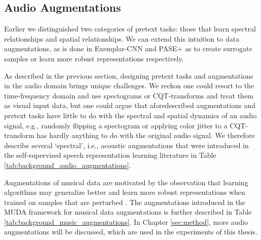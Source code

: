 \subsection{Audio Augmentations}\label{sec:audio_transformations}
Earlier we distinguished two categories of pretext tasks: those that learn spectral relationships and spatial relationships.
We can extend this intuition to data augmentations, as is done in Exemplar-CNN \cite{dosovitskiy_discriminative_2014} and PASE$+$ \cite{Ravanelli2020} as to create surrogate samples or learn more robust representations respectively.

As described in the previous section, designing pretext tasks and augmentations in the audio domain brings unique challenges.
We reckon one could resort to the time-frequency domain and use spectograms or CQT-transforms and treat them as visual input data, but one could argue that aforedescribed augmentations and pretext tasks have little to do with the spectral and spatial dynamics of an audio signal, e.g., randomly flipping a spectogram or applying color jitter to a CQT-transform has hardly anything to do with the original audio signal.
We therefore describe several `spectral', i.e., acoustic augmentations that were introduced in the self-supervised speech representation learning literature \cite{Ravanelli2020} in Table \ref{tab:background_audio_augmentations}.

Augmentations of musical data are motivated by the observation that learning algorithms may generalize better and learn more robust representations when trained on samples that are perturbed \cite{Sturm2015}.
The augmentations introduced in the MUDA framework for musical data augmentations is further described in Table \ref{tab:background_music_augmentations}.
In Chapter \ref{sec:method}, more audio augmentations will be discussed, which are used in the experiments of this thesis.

